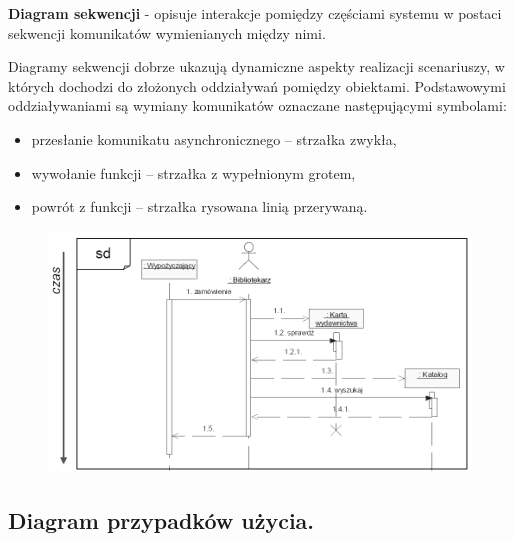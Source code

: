\documentclass[12pt]{article}
\begin{document}
    \begin{definition}
        \textbf{Diagram sekwencji} - opisuje interakcje pomiędzy częściami systemu w postaci sekwencji komunikatów
        wymienianych między nimi.

        Diagramy sekwencji dobrze ukazują dynamiczne aspekty realizacji scenariuszy, w których dochodzi do złożonych
        oddziaływań pomiędzy obiektami. Podstawowymi oddziaływaniami są wymiany komunikatów oznaczane następującymi
        symbolami:
        \begin{itemize}
            \item przesłanie komunikatu asynchronicznego – strzałka zwykła,
            \item wywołanie funkcji – strzałka z wypełnionym grotem,
            \item powrót z funkcji – strzałka rysowana linią przerywaną.
        \end{itemize}
    \end{definition}

    \begin{figure}[H]
        \includegraphics[width=\linewidth]{uml_sek.png}
    \end{figure}

    \subsection{Diagram przypadków użycia.}
\end{document}
